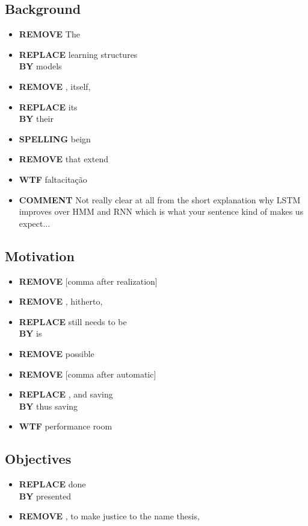 \documentclass[11pt]{scrartcl} %
\begin{document}
\subsection*{Background}
\begin{itemize}
	\item {\bf REMOVE} The
	\item {\bf REPLACE} learning structures \\{\bf BY} models
	\item {\bf REMOVE} , itself,
	\item {\bf REPLACE} its \\{\bf BY} their
	\item {\bf SPELLING} beign
	\item {\bf REMOVE} that extend
	\item {\bf WTF} faltacitação
	\item {\bf COMMENT} Not really clear at all from the short explanation why LSTM improves over HMM and RNN which is what your sentence kind of makes us expect... 
\end{itemize}

\subsection*{Motivation}
\begin{itemize}
	\item {\bf REMOVE} [comma after realization]
	\item {\bf REMOVE} , hitherto,
	\item {\bf REPLACE} still needs to be \\{\bf BY} is
	\item {\bf REMOVE} possible
	\item {\bf REMOVE} [comma after automatic]
	\item {\bf REPLACE} , and saving \\{\bf BY} thus saving
	\item {\bf WTF} performance room
\end{itemize}

\subsection*{Objectives}
\begin{itemize}
	\item {\bf REPLACE} done \\{\bf BY} presented
	\item {\bf REMOVE} , to make justice to the name thesis, 
\end{itemize}
\end{document}
